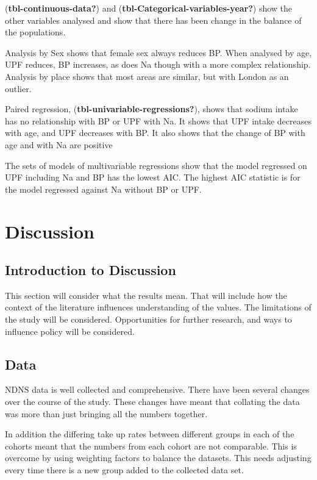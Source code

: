 \documentclass[
]{article}
\begin{document}
(\textbf{tbl-continuous-data?}) and
(\textbf{tbl-Categorical-variables-year?}) show the other variables
analysed and show that there has been change in the balance of the
populations.

Analysis by Sex shows that female sex always reduces BP. When analysed
by age, UPF reduces, BP increases, as does Na though with a more complex
relationship. Analysis by place shows that most areas are similar, but
with London as an outlier.

Paired regression, (\textbf{tbl-univariable-regressions?}), shows that
sodium intake has no relationship with BP or UPF with Na. It shows that
UPF intake decreases with age, and UPF decreases with BP. It also shows
that the change of BP with age and with Na are positive

The sets of models of multivariable regressions show that the model
regressed on UPF including Na and BP has the lowest AIC. The highest AIC
statistic is for the model regressed against Na without BP or UPF.

\newpage

\hypertarget{discussion}{%
\section{Discussion}\label{discussion}}

\hypertarget{introduction-to-discussion}{%
\subsection{Introduction to
Discussion}\label{introduction-to-discussion}}

This section will consider what the results mean. That will include how
the context of the literature influences understanding of the values.
The limitations of the study will be considered. Opportunities for
further research, and ways to influence policy will be considered.

\hypertarget{data}{%
\subsection{Data}\label{data}}

NDNS data is well collected and comprehensive. There have been several
changes over the course of the study. These changes have meant that
collating the data was more than just bringing all the numbers together.

In addition the differing take up rates between different groups in each
of the cohorts meant that the numbers from each cohort are not
comparable. This is overcome by using weighting factors to balance the
datasets. This needs adjusting every time there is a new group added to
the collected data set.
\end{document}
